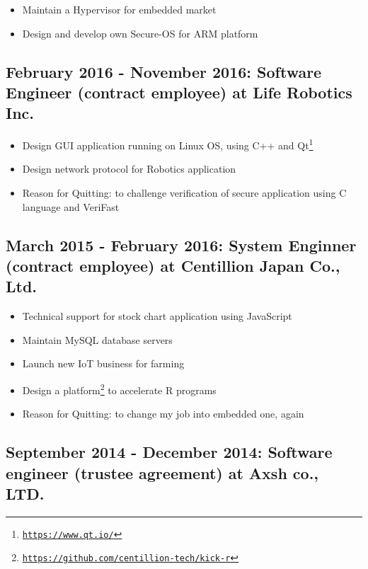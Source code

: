 \documentclass[letterpaper]{article}
\begin{document}
\begin{itemize}
  \item Maintain a Hypervisor for embedded market
  \item Design and develop own Secure-OS for ARM platform
\end{itemize}

\subsection*{February 2016 - November 2016: Software Engineer (contract employee) at Life Robotics Inc.}

\begin{itemize}
  \item Design GUI application running on Linux OS, using C++ and Qt\footnote{\href{https://www.qt.io/}{\tt https://www.qt.io/}}
  \item Design network protocol for Robotics application
  \item Reason for Quitting: to challenge verification of secure application using C language and VeriFast
\end{itemize}

\subsection*{March 2015 - February 2016: System Enginner (contract employee) at Centillion Japan Co., Ltd.}

\begin{itemize}
  \item Technical support for stock chart application using JavaScript
  \item Maintain MySQL database servers
  \item Launch new IoT business for farming
  \item Design a platform\footnote{\href{https://github.com/centillion-tech/kick-r}{\tt https://github.com/centillion-tech/kick-r}} to accelerate R programs
  \item Reason for Quitting: to change my job into embedded one, again
\end{itemize}

\subsection*{September 2014 - December 2014: Software engineer (trustee agreement) at Axsh co., LTD.}
\end{document}
